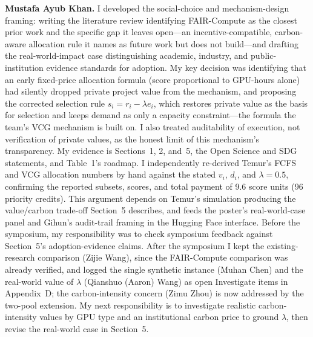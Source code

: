 \textbf{Mustafa Ayub Khan.} I developed the social-choice and mechanism-design framing: writing the literature review identifying FAIR-Compute as the closest prior work and the specific gap it leaves open---an incentive-compatible, carbon-aware allocation rule it names as future work but does not build---and drafting the real-world-impact case distinguishing academic, industry, and public-institution evidence standards for adoption. My key decision was identifying that an early fixed-price allocation formula (score proportional to GPU-hours alone) had silently dropped private project value from the mechanism, and proposing the corrected selection rule $s_i = r_i - \lambda e_i$, which restores private value as the basis for selection and keeps demand as only a capacity constraint---the formula the team's VCG mechanism is built on. I also treated auditability of execution, not verification of private values, as the honest limit of this mechanism's transparency. My evidence is Sections~1, 2, and~5, the Open Science and SDG statements, and Table~1's roadmap. I independently re-derived Temur's FCFS and VCG allocation numbers by hand against the stated $v_i$, $d_i$, and $\lambda=0.5$, confirming the reported subsets, scores, and total payment of 9.6 score units (96 priority credits). This argument depends on Temur's simulation producing the value/carbon trade-off Section~5 describes, and feeds the poster's real-world-case panel and Gihun's audit-trail framing in the Hugging Face interface. Before the symposium, my responsibility was to check symposium feedback against Section~5's adoption-evidence claims. After the symposium I kept the existing-research comparison (Zijie Wang), since the FAIR-Compute comparison was already verified, and logged the single synthetic instance (Muhan Chen) and the real-world value of $\lambda$ (Qianshuo (Aaron) Wang) as open Investigate items in Appendix~D; the carbon-intensity concern (Zimu Zhou) is now addressed by the two-pool extension. My next responsibility is to investigate realistic carbon-intensity values by GPU type and an institutional carbon price to ground $\lambda$, then revise the real-world case in Section~5.

